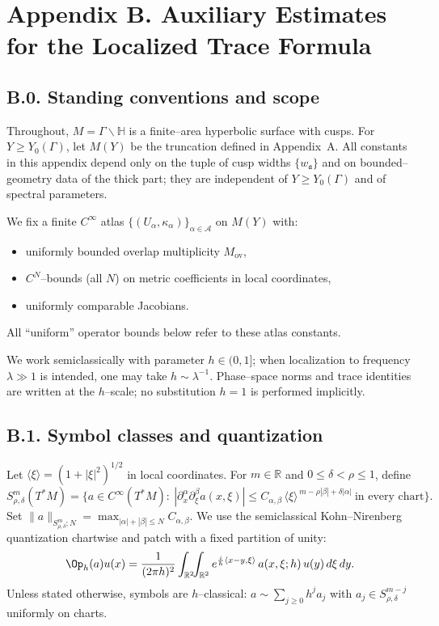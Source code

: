
\section*{Appendix B. Auxiliary Estimates for the Localized Trace Formula}

\subsection*{B.0. Standing conventions and scope}

Throughout, $M=\Gamma\backslash\mathbb H$ is a finite–area hyperbolic surface with cusps. For $Y\ge Y_0(\Gamma)$, let $M(Y)$ be the truncation defined in Appendix~A. All constants in this appendix depend only on the tuple of cusp widths $\{w_{\mathfrak a}\}$ and on bounded–geometry data of the thick part; they are independent of $Y\ge Y_0(\Gamma)$ and of spectral parameters.

We fix a finite $C^\infty$ atlas $\{(U_\alpha,\kappa_\alpha)\}_{\alpha\in\mathcal A}$ on $M(Y)$ with:
\begin{itemize}
\item uniformly bounded overlap multiplicity $M_{\mathrm{ov}}$,
\item $C^N$–bounds (all $N$) on metric coefficients in local coordinates,
\item uniformly comparable Jacobians.
\end{itemize}
All “uniform” operator bounds below refer to these atlas constants.

We work semiclassically with parameter $h\in(0,1]$; when localization to frequency $\lambda\gg1$ is intended, one may take $h\sim\lambda^{-1}$. Phase–space norms and trace identities are written at the $h$–scale; no substitution $h=1$ is performed implicitly.

\subsection*{B.1. Symbol classes and quantization}
\label{subsec:B1-symbols}

Let $\langle\xi\rangle=(1+|\xi|^2)^{1/2}$ in local coordinates. For $m\in\mathbb R$ and $0\le\delta<\rho\le1$, define
\[
S^m_{\rho,\delta}(T^*M)=\Big\{a\in C^\infty(T^*M):\ 
|\partial_x^\alpha\partial_\xi^\beta a(x,\xi)|\le C_{\alpha,\beta}\,\langle\xi\rangle^{\,m-\rho|\beta|+\delta|\alpha|}\ \text{in every chart}\Big\}.
\]
Set $\|a\|_{S^m_{\rho,\delta};N}=\max_{|\alpha|+|\beta|\le N}C_{\alpha,\beta}$.
We use the semiclassical Kohn–Nirenberg quantization chartwise and patch with a fixed partition of unity:
\[
\Op_h(a)u(x)=\frac{1}{(2\pi h)^2}\int_{\mathbb R^2}\!\!\int_{\mathbb R^2}
e^{\frac{i}{h}\langle x-y,\xi\rangle}\,a(x,\xi;h)\,u(y)\,d\xi\,dy.
\]
Unless stated otherwise, symbols are $h$–classical: $a\sim\sum_{j\ge0}h^j a_j$ with $a_j\in S^{m-j}_{\rho,\delta}$ uniformly on charts.

